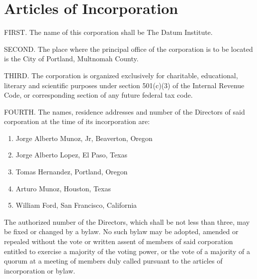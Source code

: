 \section{Articles of Incorporation}

FIRST. The name of this corporation shall be The Datum Institute.

SECOND. The place where the principal office of the corporation is to be located is the City of Portland, Multnomah County.

THIRD. The corporation is organized exclusively for charitable, educational, literary and scientific purposes under section 501(c)(3) of the Internal Revenue Code, or corresponding section of any future federal tax code. 

FOURTH. The names, residence addresses and number of the Directors of said corporation at the time of its incorporation are:

\begin{enumerate}
\item Jorge Alberto Munoz, Jr, Beaverton, Oregon
\item Jorge Alberto Lopez, El Paso, Texas
\item Tomas Hernandez, Portland, Oregon
\item Arturo Munoz, Houston, Texas
\item William Ford, San Francisco, California
\end{enumerate}

The authorized number of the Directors, which shall be not less than three, may be fixed or changed by a bylaw.  No such bylaw may be adopted, amended or repealed without the vote or written assent of members of said corporation entitled to exercise a majority of the voting power, or the vote of a majority of a quorum at a meeting of members duly called pursuant to the articles of incorporation or bylaw.